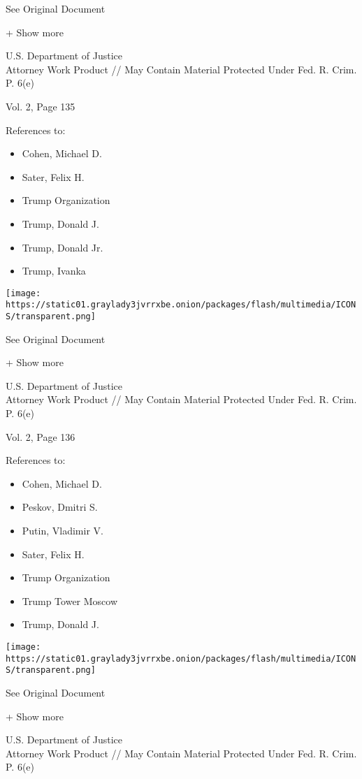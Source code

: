 See Original Document

+ Show more

U.S. Department of Justice\\
Attorney Work Product // May Contain Material Protected Under Fed. R.
Crim. P. 6(e)

Vol. 2, Page 135

References to:

\begin{itemize}
\tightlist
\item
  Cohen, Michael D.
\item
  Sater, Felix H.
\item
  Trump Organization
\item
  Trump, Donald J.
\item
  Trump, Donald Jr.
\item
  Trump, Ivanka
\end{itemize}

\protect\hyperlink{}{}

\texttt{[image: https://static01.graylady3jvrrxbe.onion/packages/flash/multimedia/ICONS/transparent.png]}

See Original Document

+ Show more

U.S. Department of Justice\\
Attorney Work Product // May Contain Material Protected Under Fed. R.
Crim. P. 6(e)

Vol. 2, Page 136

References to:

\begin{itemize}
\tightlist
\item
  Cohen, Michael D.
\item
  Peskov, Dmitri S.
\item
  Putin, Vladimir V.
\item
  Sater, Felix H.
\item
  Trump Organization
\item
  Trump Tower Moscow
\item
  Trump, Donald J.
\end{itemize}

\protect\hyperlink{}{}

\texttt{[image: https://static01.graylady3jvrrxbe.onion/packages/flash/multimedia/ICONS/transparent.png]}

See Original Document

+ Show more

U.S. Department of Justice\\
Attorney Work Product // May Contain Material Protected Under Fed. R.
Crim. P. 6(e)


